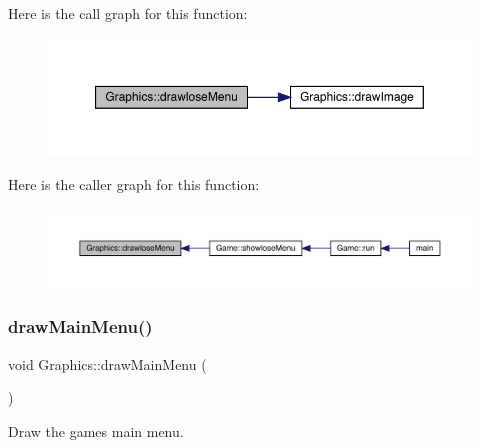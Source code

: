 Here is the call graph for this function\+:\nopagebreak
\begin{figure}[H]
\begin{center}
\leavevmode
\includegraphics[width=350pt]{class_graphics_a88bb368ba8388bc9e072c7f48208edba_cgraph}
\end{center}
\end{figure}
Here is the caller graph for this function\+:
\nopagebreak
\begin{figure}[H]
\begin{center}
\leavevmode
\includegraphics[width=350pt]{class_graphics_a88bb368ba8388bc9e072c7f48208edba_icgraph}
\end{center}
\end{figure}
\mbox{\label{class_graphics_ada6dbf202881bee3ed4bbe4ca31aecb6}} 
\subsubsection{\texorpdfstring{draw\+Main\+Menu()}{drawMainMenu()}}
{\footnotesize\ttfamily void Graphics\+::draw\+Main\+Menu (\begin{DoxyParamCaption}{ }\end{DoxyParamCaption})}



Draw the game\textquotesingle{}s main menu. 

